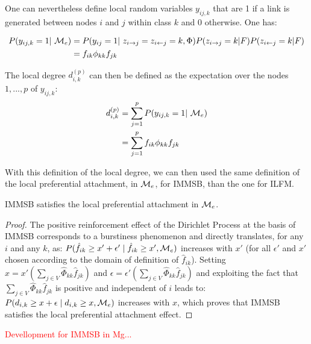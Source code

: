 One can nevertheless define  local random variables $y_{ij,k}$ that are 1 if a link is generated between nodes $i$ and $j$ within class $k$ and 0 otherwise. One has:

\begin{align*}
P(y_{ij,k}=1 | \M_e) &= P(y_{ij}=1 | z_{i\rightarrow j} = z_{i\leftarrow j}=k, \Phi) P(z_{i\rightarrow j}=k|F)P(z_{i\leftarrow j}=k|F) \\
    &= f_{ik} \phi_{kk} f_{jk}
\end{align*}

The local degree $d_{i,k}^{(p)}$ can then be defined as the expectation over the nodes $1,...,p$ of $y_{ij,k}$:
\begin{align*}
d_{i,k}^{(p)} &= \sum_{j=1}^p P(y_{ij,k}=1 | \M_e)  \\
    &= \sum_{j=1}^p f_{ik} \phi_{kk} f_{jk}
\end{align*}

With this definition of the local degree, we can then used the same definition of the local preferential attachment, in $\mathcal{M}_e$, for IMMSB, than the one for ILFM. 

\begin{proposition}
IMMSB satisfies the local preferential attachment in $\mathcal{M}_e$.
\end{proposition}

\begin{proof}
The positive reinforcement effect of the Dirichlet Process \cite{HDP} at the basis of IMMSB corresponds to a burstiness phenomenon and directly translates, for any $i$ and any $k$, as: $P(\hat{f}_{ik} \ge x'+\epsilon' \mid \hat{f}_{ik} \ge x',\mathcal{M}_e)$ increases with $x'$ (for all $\epsilon'$ and $x'$ chosen according to the domain of definition of $\hat{f}_{ik}$). Setting $x=x'(\sum_{j\in V} \hat{\Phi}_{kk} \hat{f}_{jk})$ and $\epsilon = \epsilon'(\sum_{j\in V} \hat{\Phi}_{kk} \hat{f}_{jk})$ and exploiting the fact that $\sum_{j\in V} \hat{\Phi}_{kk} \hat{f}_{jk}$ is positive and independent of $i$ leads to: $P(d_{i,k} \ge x+\epsilon \mid d_{i,k} \ge x, \mathcal{M}_e)$ increases with $x$, which proves that IMMSB satisfies the local preferential attachment effect.

\end{proof}


\textcolor{red}{Devellopment for IMMSB in Mg...}

